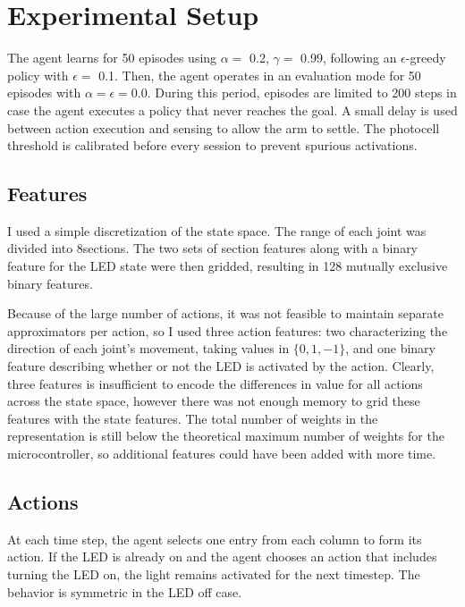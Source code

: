 \documentclass{article}
\begin{document}
	


\section{Experimental Setup}


The agent learns for 50 episodes using $\alpha =$ 0.2, $\gamma =$ 0.99,  following an $\epsilon$-greedy policy with $\epsilon=$ 0.1. Then, the agent operates in an evaluation mode for 50 episodes with $\alpha=\epsilon=0.0$. During this period, episodes are limited to 200 steps in case the agent executes a policy that never reaches the goal. A small delay is used between action execution and sensing to allow the arm to settle. The photocell threshold is calibrated before every session to prevent spurious activations.

\subsection{Features}

I used a simple discretization of the state space. The range of each joint was divided into 8\space{}\degree\space sections. The two sets of section features along with a binary feature for the LED state were then gridded, resulting in 128 mutually exclusive binary features. 

Because of the large number of actions, it was not feasible to maintain separate approximators per action, so I used three action features: two characterizing the direction of each joint's movement, taking values in $\{0, 1, -1\}$, and one binary feature describing whether or not the LED is activated by the action. Clearly, three features is insufficient to encode the differences in value for all actions across the state space, however there was not enough memory to grid these features with the state features. The total number of weights in the representation is still below the theoretical maximum number of weights for the microcontroller, so additional features could have been added with more time.


\subsection{Actions}

At each time step, the agent selects one entry from each column to form its action. If the LED is already on and the agent chooses an action that includes turning the LED on, the light remains activated for the next timestep. The behavior is symmetric in the LED off case.
\end{document}
